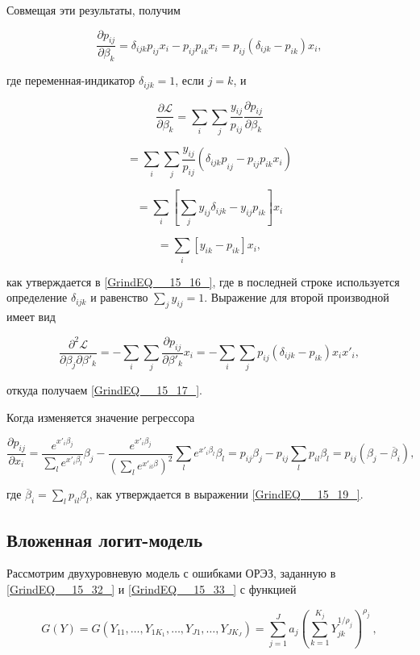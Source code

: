 Совмещая эти результаты, получим

\[\frac{\partial p_{ij}}{\partial {\beta }_k}={\delta }_{ijk}p_{ij}x_i-p_{ij}p_{ik}x_i=p_{ij}\left({\delta }_{ijk}-p_{ik}\right)x_i,\] 

где переменная-индикатор ${\delta }_{ijk}=1$, если $j=k$, и

\[\frac{\partial {\mathcal L}}{\partial {\beta }_k}=\sum_i{\sum_j{\frac{y_{ij}}{p_{ij}}\frac{\partial p_{ij}}{\partial {\beta }_k}}}\] 

\[=\sum_i{\sum_j{\frac{y_{ij}}{p_{ij}}\left({{\delta }_{ijk}p}_{ij}-p_{ij}p_{ik}x_i\right)}}\] 

\[=\sum_i{\left[\sum_j{y_{ij}{\delta }_{ijk}-y_{ij}p_{ik}}\right]x_i}\] 

\[=\sum_i{[y_{ik}-p_{ik}]}x_i,\] 

как утверждается в \eqref{GrindEQ__15_16_}, где в последней строке используется определение ${\delta }_{ijk}$ и равенство $\sum_j{y_{ij}=1}$. Выражение для второй производной имеет вид

\[\frac{{\partial }^2{\mathcal L}}{\partial {\beta }_j\partial {\beta }'_k}=-\sum_i{\sum_j{\frac{\partial p_{ij}}{\partial {\beta }'_k}x_i=-\sum_i{\sum_j{p_{ij}\left({\delta }_{ijk}-p_{ik}\right)x_ix'_i}}}},\] 

откуда получаем \eqref{GrindEQ__15_17_}.

Когда изменяется значение регрессора

\[\frac{\partial p_{ij}}{\partial x_i}=\frac{e^{x'_i{\beta }_j}}{\sum_l{e^{x'_i{\beta }_l}}}{\beta }_j-\frac{e^{x'_i{\beta }_j}}{{\left(\sum_l{e^{x'_{il}\beta }}\right)}^2}\sum_l{e^{x'_i{\beta }_l}}{\beta }_l=p_{ij}{\beta }_j-p_{ij}\sum_l{p_{il}{\beta }_l}=p_{ij}\left({\beta }_j-{\overline{\beta }}_i\right),\] 

где ${\overline{\beta }}_i=\sum_l{p_{il}{\beta }_l}$, как утверждается  в выражении \eqref{GrindEQ__15_19_}.

\subsection{Вложенная логит-модель}

Рассмотрим двухуровневую модель с ошибками ОРЭЗ, заданную в \eqref{GrindEQ__15_32_} и \eqref{GrindEQ__15_33_} с функцией

\[G\left(Y\right)=G\left(Y_{11},\dots ,Y_{1K_1},\dots ,Y_{J1},\dots ,Y_{JK_J}\right)=\sum^J_{j=1}{a_j{\left(\sum^{K_j}_{k=1}{Y^{{1}/{{\rho }_j}}_{jk}}\right)}^{{\rho }_j}\ ,}\] 


